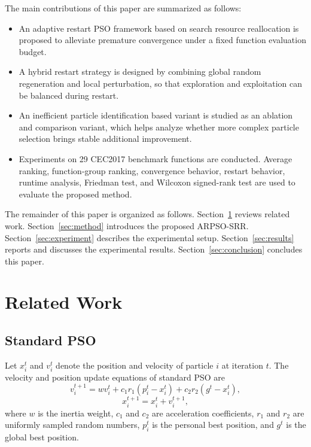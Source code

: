 \documentclass[conference]{IEEEtran}
\begin{document}
The main contributions of this paper are summarized as follows:
\begin{itemize}
    \item An adaptive restart PSO framework based on search resource reallocation is proposed to alleviate premature convergence under a fixed function evaluation budget.
    \item A hybrid restart strategy is designed by combining global random regeneration and local perturbation, so that exploration and exploitation can be balanced during restart.
    \item An inefficient particle identification based variant is studied as an ablation and comparison variant, which helps analyze whether more complex particle selection brings stable additional improvement.
    \item Experiments on 29 CEC2017 benchmark functions are conducted. Average ranking, function-group ranking, convergence behavior, restart behavior, runtime analysis, Friedman test, and Wilcoxon signed-rank test are used to evaluate the proposed method.
\end{itemize}

The remainder of this paper is organized as follows. Section~\ref{sec:related} reviews related work. Section~\ref{sec:method} introduces the proposed ARPSO-SRR. Section~\ref{sec:experiment} describes the experimental setup. Section~\ref{sec:results} reports and discusses the experimental results. Section~\ref{sec:conclusion} concludes this paper.

\section{Related Work}\label{sec:related}

\subsection{Standard PSO}
Let $x_i^t$ and $v_i^t$ denote the position and velocity of particle $i$ at iteration $t$. The velocity and position update equations of standard PSO are
\begin{equation}
    v_i^{t+1}=w v_i^t+c_1 r_1(p_i^t-x_i^t)+c_2 r_2(g^t-x_i^t),
    \label{eq:pso_velocity}
\end{equation}
\begin{equation}
    x_i^{t+1}=x_i^t+v_i^{t+1},
    \label{eq:pso_position}
\end{equation}
where $w$ is the inertia weight, $c_1$ and $c_2$ are acceleration coefficients, $r_1$ and $r_2$ are uniformly sampled random numbers, $p_i^t$ is the personal best position, and $g^t$ is the global best position.
\end{document}
